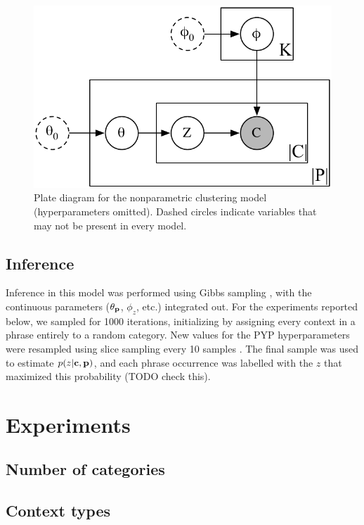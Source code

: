 \begin{figure}
\begin{center}
\includegraphics[scale=0.75]{pyp_clustering/np_plate.pdf}
\vspace{-0.3cm}
\end{center}
\caption{Plate diagram for the nonparametric clustering model (hyperparameters omitted).  Dashed circles indicate variables that may not be present in every model.}
\label{fig:np_plate}
\end{figure}

\subsection{Inference}

Inference in this model was performed using Gibbs sampling \citep{geman:1984}, with the continuous parameters ($\theta_{\textbf{p}}$, $\phi_z$, etc.) integrated out.  For the experiments reported below, we sampled for 1000 iterations, initializing by assigning every context in a phrase entirely to a random category.  New values for the PYP hyperparameters were resampled using slice sampling every 10 samples \citep{neal:2000,johnson:2009}. The final sample was used to estimate $p(z|\textbf{c},\textbf{p})$, and each phrase occurrence was labelled with the $z$ that maximized this probability (TODO check this).

\section{Experiments}

\subsection{Number of categories}

\subsection{Context types}


